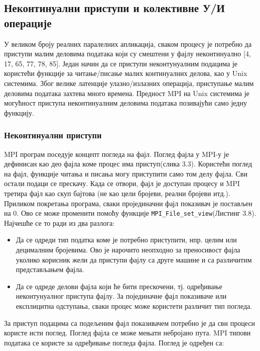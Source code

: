 \subsection{Неконтинуални приступи и колективне У/И операције}

У великом броју реалних паралелних апликација, сваком процесу је потребно да приступи малим деловима података који су смештени у фајлу неконтинуално  [4, 17, 65, 77, 78, 85].
Један начин да се приступи неконтунуалним подацима је користећи функције за читање/писање малих континуалних делова, као у Unix системима. Због велике латенције улазно/излазних операција, приступање малим деловима података захтева много времена. Предност MPI на Unix системима је могућност приступа неконтинуалним деловима података позивајући само једну функцију. 

\subsubsection{Неконтинуални приступи}
MPI програм поседује концепт погледа на фајл. Поглед фајла у MPI-у је дефинисан као део фајла коме процес има приступ(слика 3.3). Користећи поглед на фајл, функције читања и писања могу приступити само том делу фајла. Сви остали подаци се прескачу. Када се отвори, фајл је доступан процесу и MPI третира фајл као скуп бајтова (не као цели бројеви, реални бројеви итд.). Приликом покретања програма, сваки пројединачни фајл показивач је постављен на 0. Ово се може променити помоћу функције \texttt{MPI\_File\_set\_view}(Листинг 3.8). Најчешће се то ради из два разлога:

\begin{itemize}
\item Да се одреди тип податка коме је потребно приступити, нпр. целим или децималним бројевима. 
Ово је нарочито неопходно за преносивост фајла уколико корисник жели да приступи фајлу са друге машине и са различитим представљањем фајла. 

\item Да се одреде делови фајла који ће бити прескочени, тј. одређивање неконтунуалног приступа фајлу. За појединачне фајл показиваче или експлицитна одступања, сваки процес може користети различит тип погледа.
\end{itemize}

За приступ подацима са подељеним фајл показивачем потребно је да сви процеси користе исти поглед. Поглед фајла се може мењати небројано пута.
MPI типови података се користе за одређивање погледа фајла. Поглед је одређен са:

